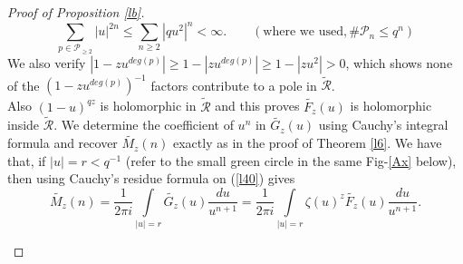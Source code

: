 \documentclass[12pt]{amsart}
\numberwithin{equation}{section}
\theoremstyle{remark}
\theoremstyle{remark}
\theoremstyle{definition}
\begin{document}
\begin{proof}[Proof of Proposition \ref{lb}]
$$\displaystyle\sum\limits_{p\in\mathcal{P}_{\geqslant 2}}|u|^{2n}\leqslant \displaystyle\sum\limits_{n\geqslant 2}|qu^2|^{n}<\infty.\qquad (\text {where we used}, \# \mathcal{P}_n\leqslant q^n)$$
We also verify $|1-zu^{deg(p)}|\geqslant 1-|zu^{deg(p)}|\geqslant 1-|zu^2|>0$, which shows none of the $\left(1-zu^{deg(p)} \right)^{-1}$ factors contribute to a pole in $\widetilde{\mathcal{R}}$.\\
Also $(1-u)^{qz}$ is holomorphic in $\widetilde{\mathcal{R}}$ and this proves $\widetilde{F_z}(u)$ is holomorphic inside $\widetilde{\mathcal{R}}$.
We determine the coefficient of $u^n$ in $\widetilde{{G}_z}(u)$ using Cauchy's integral formula and recover $\widetilde{{M}_z}(n)$ exactly as in the proof of Theorem \ref{l6}. We have that, if $|u|=r < q^{-1}$ (refer to the small green circle in the same Fig-\ref{Ax} below), then using Cauchy's residue formula on (\ref{l40}) gives
\begin{equation}\label{lg}
\widetilde{M_z}(n)=\dfrac{1}{2\pi i}\displaystyle\int\limits_{|u|=r}\widetilde{G_z}(u) \dfrac{du}{u^{n+1}}=\dfrac{1}{2\pi i}\displaystyle\int\limits_{|u|=r}\zeta(u)^z\widetilde{F_z}(u) \dfrac{du}{u^{n+1}}.
\end{equation}
\begin{figure}[h]
    \centering
    

\end{figure}
\end{proof}
\end{document}
